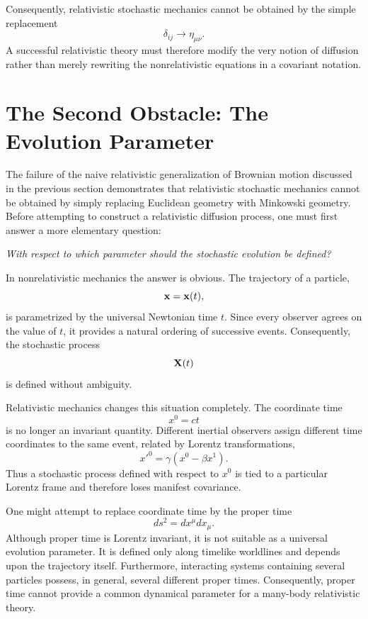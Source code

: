 Consequently, relativistic stochastic mechanics cannot be obtained by the
simple replacement
\[\delta_{ij}\longrightarrow\eta_{\mu\nu}.\]
A successful relativistic theory must therefore modify the very notion of
diffusion rather than merely rewriting the nonrelativistic equations in a
covariant notation.

\section{The Second Obstacle: The Evolution Parameter}

The failure of the naive relativistic generalization of Brownian motion
discussed in the previous section demonstrates that relativistic stochastic
mechanics cannot be obtained by simply replacing Euclidean geometry with
Minkowski geometry. Before attempting to construct a relativistic diffusion
process, one must first answer a more elementary question:
\begin{center}
\emph{With respect to which parameter should the stochastic evolution be
defined?}
\end{center}

In nonrelativistic mechanics the answer is obvious. The trajectory of a
particle,
\[{\bf x}={\bf x}(t),\]
is parametrized by the universal Newtonian time $t$. Since every observer
agrees on the value of $t$, it provides a natural ordering of successive
events. Consequently, the stochastic process
\[{\bf X}(t)\]
is defined without ambiguity.

Relativistic mechanics changes this situation completely. The coordinate time
\[x^0=ct\]
is no longer an invariant quantity. Different inertial observers assign
different time coordinates to the same event, related by Lorentz
transformations,
\[x'^{0}=\gamma(x^{0}-\beta x^{1}).\]
Thus a stochastic process defined with respect to $x^0$ is tied to a
particular Lorentz frame and therefore loses manifest covariance.

One might attempt to replace coordinate time by the proper time
\[ds^{2}=dx^{\mu}dx_{\mu}.\]
Although proper time is Lorentz invariant, it is not suitable as a universal
evolution parameter. It is defined only along timelike worldlines and depends
upon the trajectory itself. Furthermore, interacting systems containing
several particles possess, in general, several different proper times.
Consequently, proper time cannot provide a common dynamical parameter for a
many-body relativistic theory.

